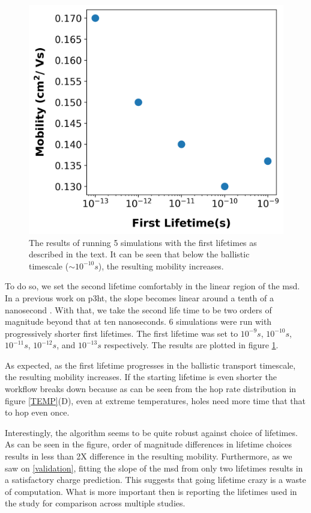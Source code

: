 \begin{figure}
  \center
  \includegraphics[width=0.6\linewidth]{figures/lifetime.png} 
    \caption{The results of running 5  simulations with the first lifetimes as described in the text. It
    can be seen that below the ballistic timescale (${\sim}10^{-10}s$), the
    resulting mobility increases.}
  \label{lifetime}
\end{figure}

To do so, we set the second lifetime comfortably in the linear region of the
\gls{msd}. 
In a previous work on \gls{p3ht}, the slope becomes linear around a tenth of a
nanosecond \cite{Jones2017}. With that, we take the second life time to be two
orders of magnitude beyond that at ten nanoseconds.
$6$ simulations were run with progressively shorter first lifetimes.
The first lifetime was set to $10^{-9}s$, $10^{-10}s$,
$10^{-11}s$, $10^{-12}s$, and $10^{-13}s$ respectively. The results are plotted in figure
\ref{lifetime}. 

As expected, as the first lifetime progresses in the ballistic transport
timescale, the resulting mobility increases. If the starting lifetime is even shorter the
workflow breaks down because as can be seen from the hop rate distribution in figure \ref{TEMP}(D), even at
extreme temperatures, holes need more time that that to hop even once.

Interestingly, the algorithm seems to be quite robust against choice of lifetimes. As can be seen in the
figure, order of magnitude differences in lifetime choices results in less than 2X difference in the resulting
mobility. Furthermore, as we saw on \autoref{validation}, fitting the slope of
the \gls{msd} from only two lifetimes results in a satisfactory charge prediction.
This suggests that going lifetime crazy is a waste of computation. What is more
important then is reporting the lifetimes used in the study for comparison
across multiple studies. 


